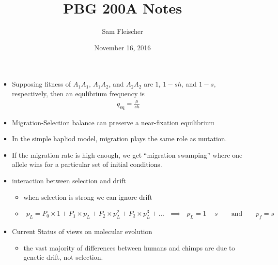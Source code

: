 \documentclass{article}
\title{PBG 200A Notes}
\author{Sam Fleischer}
\date{November 16, 2016}
\newcommand{\qiq}{\ \ \ \implies\ \ \ }
\begin{document}
    \maketitle

    \begin{itemize}
        \item Supposing fitness of $A_1A_1$, $A_1A_2$, and $A_2A_2$ are $1$, $1-sh$, and $1-s$, respectively, then an equlibrium frequency is
        \begin{align}
            q_\text{eq} = \frac{\mu}{sh}
        \end{align}
        \item Migration-Selection balance can preserve a near-fixation equilibrium
        \item In the simple hapliod model, migration plays the same role as mutation.
        \item If the migration rate is high enough, we get ``migration swamping'' where one allele wins for a particular set of initial conditions.
        \item interaction between selection and drift
        \begin{itemize}
            \item when selection is strong we can ignore drift
            \item \begin{align}
                p_L = P_0\times 1 + P_1\times p_L + P_2\times p_L^2 + P_3 \times p_L^3 + \dots \qiq p_L = 1 - s \qquad \text{and} \qquad p_f = s
            \end{align}
        \end{itemize}
        \item Current Status of views on molecular evolution
        \begin{itemize}
            \item the vast majority of differences between humans and chimps are due to genetic drift, not selection.
        \end{itemize}
    \end{itemize}
\end{document}
